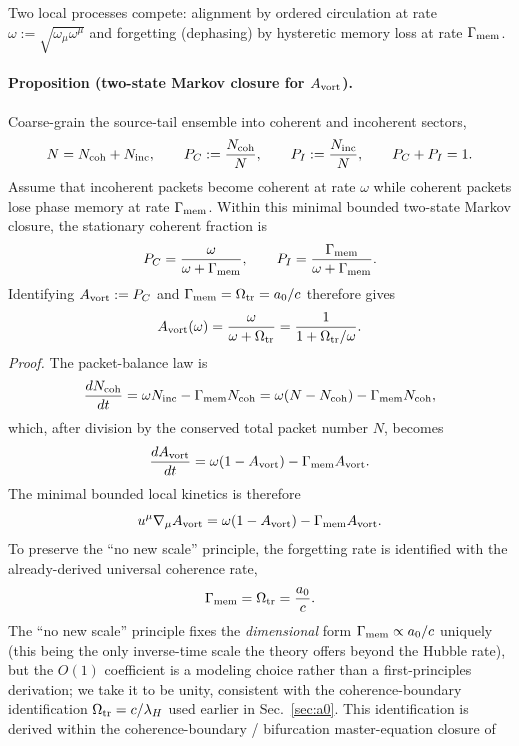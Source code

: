 \documentclass[11pt]{article}
\begin{document}
Two local processes compete: alignment by ordered circulation at rate
$\omega:=\sqrt{\omega_\mu\omega^\mu}$ and forgetting (dephasing) by
hysteretic memory loss at rate $\Gamma_{\rm mem}$.

\paragraph{Proposition (two-state Markov closure for $A_{\rm vort}$).}
Coarse-grain the source-tail ensemble into coherent and incoherent sectors,
\[
N=N_{\rm coh}+N_{\rm inc},
\qquad
P_C:=\frac{N_{\rm coh}}{N},
\qquad
P_I:=\frac{N_{\rm inc}}{N},
\qquad
P_C+P_I=1.
\]
Assume that incoherent packets become coherent at rate $\omega$ while
coherent packets lose phase memory at rate $\Gamma_{\rm mem}$.  Within this
minimal bounded two-state Markov closure, the stationary coherent fraction is
\begin{equation}
P_C
= \frac{\omega}{\omega+\Gamma_{\rm mem}},
\qquad
P_I
= \frac{\Gamma_{\rm mem}}{\omega+\Gamma_{\rm mem}}.
\label{eq:markov_avort}
\end{equation}
Identifying $A_{\rm vort}:=P_C$ and
$\Gamma_{\rm mem}=\Omega_{\rm tr}=a_0/c$ therefore gives
\begin{equation}
A_{\rm vort}(\omega)
= \frac{\omega}{\omega+\Omega_{\rm tr}}
= \frac{1}{1+\Omega_{\rm tr}/\omega}.
\label{eq:avort_markov_closed}
\end{equation}
\textit{Proof.}
The packet-balance law is
\[
\frac{dN_{\rm coh}}{dt}
= \omega N_{\rm inc}-\Gamma_{\rm mem}N_{\rm coh}
= \omega(N-N_{\rm coh})-\Gamma_{\rm mem}N_{\rm coh},
\]
which, after division by the conserved total packet number $N$, becomes
\[
\frac{dA_{\rm vort}}{dt}
= \omega(1-A_{\rm vort})-\Gamma_{\rm mem}A_{\rm vort}.
\]
The minimal bounded local kinetics is therefore
\[
u^\mu\nabla_\mu A_{\rm vort}
= \omega(1-A_{\rm vort})-\Gamma_{\rm mem}A_{\rm vort}.
\]
To preserve the ``no new scale'' principle, the forgetting rate is identified
with the already-derived universal coherence rate,
\[
\Gamma_{\rm mem}=\Omega_{\rm tr}=\frac{a_0}{c}.
\]
The ``no new scale'' principle fixes the \emph{dimensional} form
$\Gamma_{\rm mem}\propto a_0/c$ uniquely (this being the only
inverse-time scale the theory offers beyond the Hubble rate), but the
$O(1)$ coefficient is a modeling choice rather than a first-principles
derivation; we take it to be unity, consistent with the
coherence-boundary identification $\Omega_{\rm tr}=c/\lambda_H$ used
earlier in Sec.~\ref{sec:a0}.  This identification is derived within the
coherence-boundary / bifurcation master-equation closure of
\end{document}
